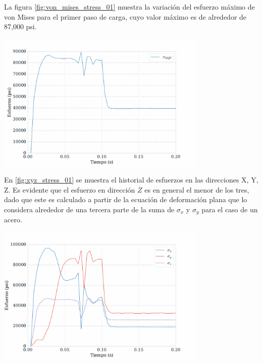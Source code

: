 La figura \ref{fig:von_mises_stress_01} muestra la variación del esfuerzo máximo 
de von Mises para el primer paso de carga, cuyo valor máximo es de alrededor de 87,000 psi.

\begin{center}
\includegraphics[width=0.75\textwidth]{src/ch4/von_mises_stress_01.pdf}
\label{fig:von_mises_stress_01}
\end{center}

En \ref{fig:xyz_stress_01} se muestra el historial de esfuerzos en las direcciones 
X, Y, Z. Es evidente que el esfuerzo en dirección $Z$ es en general el menor de 
los tres, dado que este es calculado a partir de la ecuación de deformación plana 
que lo considera alrededor de una tercera parte de la suma de $\sigma_x$ y $\sigma_y$ para 
el caso de un acero. \\

\begin{center}
\includegraphics[width=0.75\textwidth]{src/ch4/xyz_stress_01.pdf}
\label{fig:xyz_stress_01}
\end{center}

